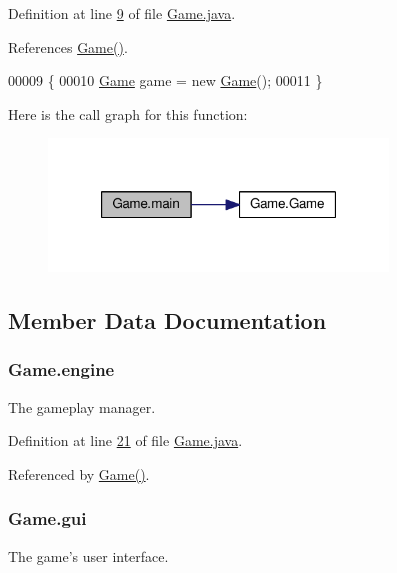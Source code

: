Definition at line \hyperlink{Game_8java_source_l00009}{9} of file \hyperlink{Game_8java_source}{Game.\-java}.



References \hyperlink{Game_8java_source_l00026}{Game()}.


\begin{DoxyCode}
00009                                            \{
00010         \hyperlink{classGame}{Game} game = \textcolor{keyword}{new} \hyperlink{classGame_a2e034e53e9c032964ecd2a831b29a616}{Game}();
00011     \}
\end{DoxyCode}


Here is the call graph for this function\-:
\nopagebreak
\begin{figure}[H]
\begin{center}
\leavevmode
\includegraphics[width=256pt]{classGame_ae52595a27ac1b327b05db2129ad81fca_cgraph}
\end{center}
\end{figure}




\subsection{Member Data Documentation}
\hypertarget{classGame_a899fc9c2339c51abd4594b6a5e44284f}{
\subsubsection[{engine}]{ Game.\-engine\hspace{0.3cm}{\ttfamily [private]}}}\label{classGame_a899fc9c2339c51abd4594b6a5e44284f}
The gameplay manager. 

Definition at line \hyperlink{Game_8java_source_l00021}{21} of file \hyperlink{Game_8java_source}{Game.\-java}.



Referenced by \hyperlink{Game_8java_source_l00026}{Game()}.

\hypertarget{classGame_a9003da90b15756c7975d03db874632a4}{
\subsubsection[{gui}]{ Game.\-gui\hspace{0.3cm}{\ttfamily [private]}}}\label{classGame_a9003da90b15756c7975d03db874632a4}
The game's user interface. 

